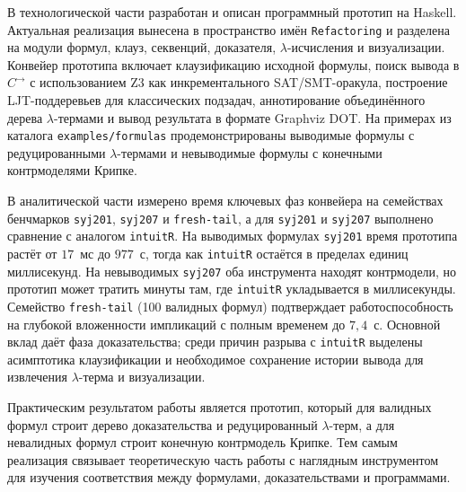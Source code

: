 \documentclass[14pt, russian]{scrartcl}
\begin{document}
В технологической части разработан и описан программный прототип на Haskell.
Актуальная реализация вынесена в пространство имён \texttt{Refactoring} и
разделена на модули формул, клауз, секвенций, доказателя, $\lambda$-исчисления
и визуализации. Конвейер прототипа включает клаузификацию исходной формулы,
поиск вывода в $C^{\rightarrow}$ с использованием Z3 как инкрементального
SAT/SMT-оракула, построение LJT-поддеревьев для классических подзадач,
аннотирование объединённого дерева $\lambda$-термами и вывод результата в
формате Graphviz DOT. На примерах из каталога \texttt{examples/formulas}
продемонстрированы выводимые формулы с редуцированными $\lambda$-термами и
невыводимые формулы с конечными контрмоделями Крипке.

В аналитической части измерено время ключевых фаз конвейера на семействах
бенчмарков \texttt{syj201}, \texttt{syj207} и \texttt{fresh-tail}, а для
\texttt{syj201} и \texttt{syj207} выполнено сравнение с аналогом
\texttt{intuitR}. На выводимых формулах \texttt{syj201} время прототипа растёт
от $17$~мс до $977$~с, тогда как \texttt{intuitR} остаётся в пределах единиц
миллисекунд. На невыводимых \texttt{syj207} оба инструмента находят
контрмодели, но прототип может тратить минуты там, где \texttt{intuitR}
укладывается в миллисекунды. Семейство \texttt{fresh-tail} (100 валидных
формул) подтверждает работоспособность на глубокой вложенности импликаций
с полным временем до $7{,}4$~с. Основной вклад даёт фаза доказательства;
среди причин разрыва с \texttt{intuitR} выделены асимптотика клаузификации
и необходимое сохранение истории вывода для извлечения $\lambda$-терма и
визуализации.

Практическим результатом работы является прототип, который для валидных формул
строит дерево доказательства и редуцированный $\lambda$-терм, а для невалидных
формул строит конечную контрмодель Крипке. Тем самым реализация связывает
теоретическую часть работы с наглядным инструментом для изучения соответствия
между формулами, доказательствами и программами.


\printbibliography[heading=none]

\anonappendix
\label{app:ljt}
\end{document}
